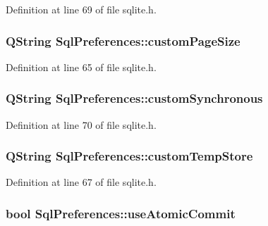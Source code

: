 \-Definition at line 69 of file sqlite.\-h.

\hypertarget{structSqlPreferences_aeaa6fa937ead293aa8cd41b86f1c5cf4}{
\subsubsection[{custom\-Page\-Size}]{\setlength{\rightskip}{0pt plus 5cm}\-Q\-String {\bf \-Sql\-Preferences\-::custom\-Page\-Size}}}\label{structSqlPreferences_aeaa6fa937ead293aa8cd41b86f1c5cf4}


\-Definition at line 65 of file sqlite.\-h.

\hypertarget{structSqlPreferences_a7d309904c4edb9f888d0c8a810def2d1}{
\subsubsection[{custom\-Synchronous}]{\setlength{\rightskip}{0pt plus 5cm}\-Q\-String {\bf \-Sql\-Preferences\-::custom\-Synchronous}}}\label{structSqlPreferences_a7d309904c4edb9f888d0c8a810def2d1}


\-Definition at line 70 of file sqlite.\-h.

\hypertarget{structSqlPreferences_a36b942f872c390f204cc5542fc0662de}{
\subsubsection[{custom\-Temp\-Store}]{\setlength{\rightskip}{0pt plus 5cm}\-Q\-String {\bf \-Sql\-Preferences\-::custom\-Temp\-Store}}}\label{structSqlPreferences_a36b942f872c390f204cc5542fc0662de}


\-Definition at line 67 of file sqlite.\-h.

\hypertarget{structSqlPreferences_a36464d4021afe0e0919cce650a1519fe}{
\subsubsection[{use\-Atomic\-Commit}]{\setlength{\rightskip}{0pt plus 5cm}bool {\bf \-Sql\-Preferences\-::use\-Atomic\-Commit}}}\label{structSqlPreferences_a36464d4021afe0e0919cce650a1519fe}


